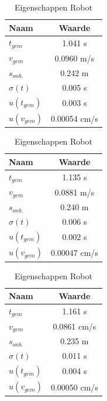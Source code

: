 \documentclass{report}
\begin{document}
\begin{table}
	\centering
	\caption{Eigenschappen Robot}
	\label{tab:resCali}
	\begin{subtable}[b]{0.30\textwidth}
		\centering
		\begin{tabular}{| l| c|}
		\hline
			Naam & Waarde \\
		\hline
			$t_{gem}$ & 1.041 s \\
		\hline
			$v_{gem}$ & 0.0960 m/s \\
		\hline
			$s_{onb.}$ & 0.242 m \\
		\hline		   
			$\sigma(t)$ & 0.005 s \\
		\hline
			$u(t_{gem})$ & 0.003 s  \\
		\hline
			$u(v_{gem})$ & 0.00054 cm/s \\
		\hline
		\end{tabular}
	\end{subtable}
	\quad
	\begin{subtable}[b]{0.30\textwidth}
		\centering
		\begin{tabular}{| l| c|}
		\hline
		   Naam & Waarde \\
		\hline
		   $t_{gem}$ & 1.135 s \\
		\hline
		   $v_{gem}$ & 0.0881 m/s \\
		\hline
			$s_{onb.}$ & 0.240 m \\
		\hline
		   $\sigma(t)$ & 0.006 s \\
		\hline
		   $u(t_{gem})$ & 0.002 s  \\
		\hline
		   $u(v_{gem})$ & 0.00047 cm/s \\
		\hline
		\end{tabular}
	\end{subtable}
	\quad
	\begin{subtable}[b]{0.30\textwidth}
		\centering
		\begin{tabular}{| l| c|}
		\hline
		   Naam & Waarde \\
		\hline
		   $t_{gem}$ & 1.161 s \\
		\hline
		   $v_{gem}$ & 0.0861 cm/s \\
		\hline
			$s_{onb.}$ & 0.235 m \\
		\hline
		   $\sigma(t)$ & 0.011 s \\
		\hline
		   $u(t_{gem})$ & 0.004 s  \\
		\hline
		   $u(v_{gem})$ & 0.00050 cm/s \\
		\hline
		\end{tabular}
	\end{subtable}
\end{table}
\end{document}
